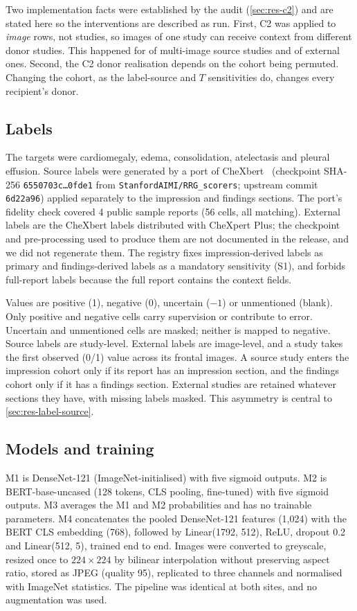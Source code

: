 Two implementation facts were established by the audit
(\cref{sec:res-c2}) and are stated here so the interventions are described as
run. First, C2 was applied to \emph{image} rows, not studies, so images of one
study can receive context from different donor studies. This happened for
\CTwoMultiDonorSrc{} of \CTwoMultiImgSrc{} multi-image source studies and
\CTwoMultiDonorExt{} of \CTwoMultiImgExt{} external ones. Second, the C2 donor
realisation depends on the cohort being permuted. Changing the cohort, as the
label-source and $T$ sensitivities do, changes every recipient's donor.

\subsection{Labels}
The targets were cardiomegaly, edema, consolidation, atelectasis and pleural
effusion. Source labels were generated by a port of CheXbert~\cite{smit2020chexbert}
(checkpoint SHA-256 \texttt{6550703c\ldots0fde1} from
\texttt{StanfordAIMI/RRG\_scorers}; upstream commit \texttt{6d22a96})
applied separately to the impression and findings sections. The port's fidelity
check covered 4 public sample reports (56 cells, all matching). External labels
are the CheXbert labels distributed with CheXpert Plus; the checkpoint and
pre-processing used to produce them are not documented in the release, and we
did not regenerate them. The registry fixes impression-derived labels as
primary and findings-derived labels as a mandatory sensitivity (S1), and
forbids full-report labels because the full report contains the context
fields.

Values are positive (1), negative (0), uncertain ($-1$) or unmentioned (blank).
Only positive and negative cells carry supervision or contribute to error.
Uncertain and unmentioned cells are masked; neither is mapped to negative.
Source labels are study-level. External labels are image-level, and a study
takes the first observed (0/1) value across its frontal images. A source study
enters the impression cohort only if its report has an impression section, and
the findings cohort only if it has a findings section. External studies are
retained whatever sections they have, with missing labels masked. This asymmetry
is central to \cref{sec:res-label-source}.

\subsection{Models and training}
M1 is DenseNet-121 (ImageNet-initialised) with five sigmoid outputs. M2 is
BERT-base-uncased (128 tokens, CLS pooling, fine-tuned) with five sigmoid
outputs. M3 averages the M1 and M2 probabilities and has no trainable
parameters. M4 concatenates the pooled DenseNet-121 features (1,024) with the BERT
CLS embedding (768), followed by Linear(1792, 512), ReLU, dropout 0.2 and
Linear(512, 5), trained end to end. Images were converted to greyscale, resized
once to $224\times224$ by bilinear interpolation without preserving aspect
ratio, stored as JPEG (quality 95), replicated to three channels and normalised
with ImageNet statistics. The pipeline was identical at both sites, and no
augmentation was used.

